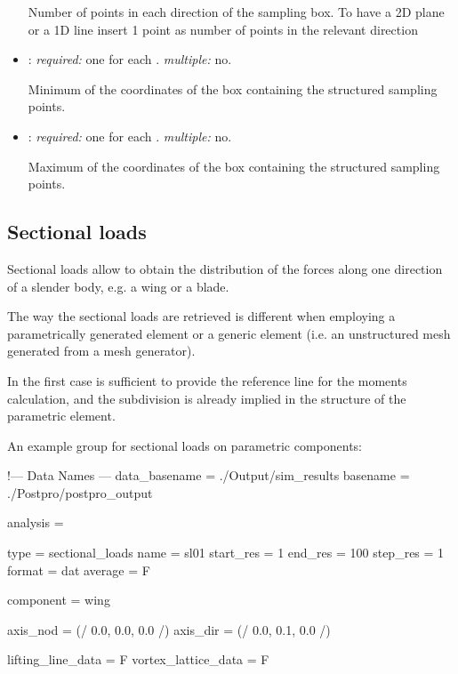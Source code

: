 \begin{itemize}
Number of points in each direction of the sampling box. To have a 2D plane or a 1D line insert 1 point as number of points in the relevant direction

\item {}: \textit{required:} one for each . \textit{multiple:} no.

Minimum of the coordinates of the box containing the structured sampling points.

\item {}: \textit{required:} one for each . \textit{multiple:} no.

Maximum of the coordinates of the box containing the structured sampling points.

\end{itemize}

\subsection{Sectional loads}

Sectional loads allow to obtain the distribution of the forces along one direction of a slender body, e.g. a wing or a blade. 

The way the sectional loads are retrieved is different when employing a parametrically generated element or a generic element (i.e. an unstructured mesh generated from a mesh generator). 

In the first case is sufficient to provide the reference line for the moments calculation, and the subdivision is already implied in the structure of the parametric element. 

An example  group for sectional loads on parametric components:

\begin{inputfile}[frame=single, caption={dust\_post.in for sectional load on parametric components}, label={file:dust_post.in_sectional_param}]
!--- Data Names ---
data_basename = ./Output/sim_results
basename =     ./Postpro/postpro_output

analysis = {

type = sectional_loads
name = sl01
start_res = 1
end_res   = 100 
step_res  = 1
format = dat
average = F

component = wing

axis_nod = (/ 0.0, 0.0, 0.0 /)
axis_dir = (/ 0.0, 0.1, 0.0 /)

lifting_line_data = F
vortex_lattice_data = F
}
\end{inputfile}


